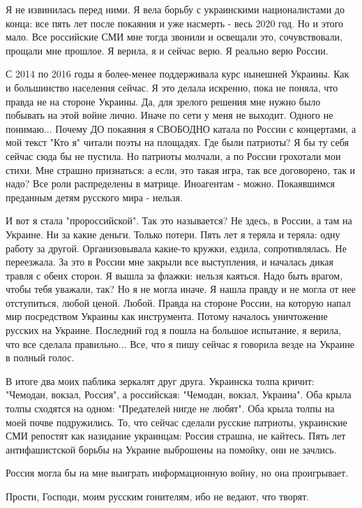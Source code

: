 Я не извинилась перед ними. Я вела борьбу с украинскими националистами до
конца: все пять лет после покаяния и уже насмерть - весь 2020 год. Но и этого
мало. Все российские СМИ мне тогда звонили и освещали это, сочувствовали,
прощали мне прошлое. Я верила, я и сейчас верю. Я реально верю России.

С 2014 по 2016 годы я более-менее поддерживала курс нынешней Украины. Как и
большинство населения сейчас. Я это делала искренно, пока не поняла, что правда
не на стороне Украины. Да, для зрелого решения мне нужно было побывать на этой
войне лично. Иначе по сети у меня не выходит. Одного не понимаю... Почему ДО
покаяния я СВОБОДНО катала по России с концертами, а мой текст "Кто я" читали
поэты на площадях. Где были патриоты? Я бы ту себя сейчас сюда бы не пустила.
Но патриоты молчали, а по России грохотали мои стихи. Мне страшно признаться: а
если, это такая игра, так все договорено, так и надо? Все роли распределены в
матрице. Иноагентам - можно. Покаявшимся преданным детям русского мира -
нельзя.

И вот я стала "пророссийской". Так это называется? Не здесь, в России, а там на
Украине. Ни за какие деньги. Только потери. Пять лет я теряла и теряла: одну
работу за другой. Организовывала какие-то кружки, ездила, сопротивлялась. Не
переезжала. За это в России мне закрыли все выступления, и началась дикая
травля с обеих сторон. Я вышла за флажки: нельзя каяться. Надо быть врагом,
чтобы тебя уважали, так? Но я не могла иначе. Я нашла правду и не могла от нее
отступиться, любой ценой. Любой. Правда на стороне России, на которую напал мир
посредством Украины как инструмента. Потому началось уничтожение русских на
Украине. Последний год я пошла на большое испытание, я верила, что все сделала
правильно... Все, что я пишу сейчас я говорила везде на Украине в полный голос.

В итоге два моих паблика зеркалят друг друга. Украинска толпа кричит: "Чемодан,
вокзал, Россия", а российская: "Чемодан, вокзал, Украина". Оба крыла толпы
сходятся на одном: "Предателей нигде не любят". Оба крыла толпы на моей почве
подружились. То, что сейчас сделали русские патриоты, украинские СМИ репостят
как назидание украинцам: Россия страшна, не кайтесь. Пять лет антифашистской
борьбы на Украине выброшены на помойку, они не зачлись.

Россия могла бы на мне выиграть информационную войну, но она проигрывает.

Прости, Господи, моим русским гонителям, ибо не ведают, что творят.

